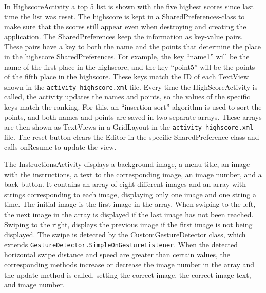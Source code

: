 In HighscoreActivity a top 5 list is shown with the five highest scores since last time the list was reset. The highscore is kept in a SharedPreferences-class to make sure that the scores still appear even when destroying and creating the application. The SharedPreferences keep the information as key-value pairs. These pairs have a key to both the name and the points that determine the place in the highscore SharedPreferences. For example, the key “name1” will be the name of the first place in the highscore, and the key “point5” will be the points of the fifth place in the highscore. These keys match the ID of each TextView shown in the \verb|activity_highscore.xml| file. Every time the HighScoreActivity is called, the activity updates the names and points, so the values of the specific keys match the ranking. For this, an “insertion sort”-algorithm is used to sort the points, and both names and points are saved in two separate arrays. These arrays are then shown as TextViews in a GridLayout in the \verb|activity_highscore.xml| file.
The reset button clears the Editor in the specific SharedPreference-class and calls onResume to update the view.   \newline

The InstructionsActivity displays a background image, a menu title, an image with the instructions, a text to the corresponding image, an image number, and a back button. It contains an array of eight different images and an array with strings corresponding to each image, displaying only one image and one string a time. The initial image is the first image in the array. When swiping to the left, the next image in the array is displayed if the last image has not been reached. Swiping to the right, displays the previous image if the first image is not being displayed. The swipe is detected by the CustomGestureDetector class, which extends \verb|GestureDetector.SimpleOnGestureListener|. When the detected horizontal swipe distance and speed are greater than certain values, the corresponding methods increase or decrease the image number in the array and the update method is called, setting the correct image, the correct image text, and image number. \newline

